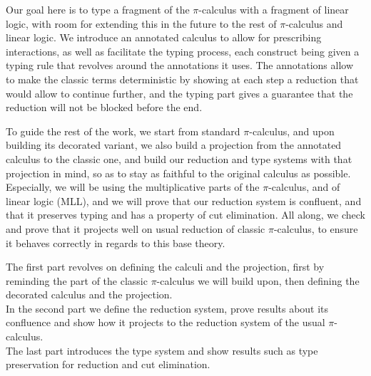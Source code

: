 Our goal here is to type a fragment of the $\pi$-calculus with a fragment of linear logic, with room for extending this in the future to the rest of $\pi$-calculus and linear logic. We introduce an annotated calculus to allow for prescribing interactions, as well as facilitate the typing process, each construct being given a typing rule that revolves around the annotations it uses. The annotations allow to make the classic terms deterministic by showing at each step a reduction that would allow to continue further, and the typing part gives a guarantee that the reduction will not be blocked before the end.

To guide the rest of the work, we start from standard $\pi$-calculus, and upon building its decorated variant, we also build a projection from the annotated calculus to the classic one, and build our reduction and type systems with that projection in mind, so as to stay as faithful to the original calculus as possible.\\
Especially, we will be using the multiplicative parts of the $\pi$-calculus, and of linear logic (MLL), and we will prove that our reduction system is confluent, and that it preserves typing and has a property of cut elimination. All along, we check and prove that it projects well on usual reduction of classic $\pi$-calculus, to ensure it behaves correctly in regards to this base theory.\\

\bigskip

The first part revolves on defining the calculi and the projection, first by reminding the part of the classic $\pi$-calculus we will build upon, then defining the decorated calculus and the projection.\\
In the second part we define the reduction system, prove results about its confluence and show how it projects to the reduction system of the usual $\pi$-calculus.\\
The last part introduces the type system and show results such as type preservation for reduction and cut elimination.